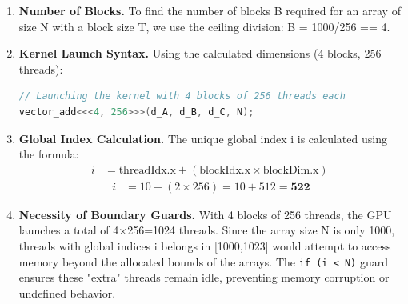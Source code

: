 
\begin{enumerate}[label=(\alph*)]
  \item \textbf{Number of Blocks.} To find the number of blocks B required for an array of size N with a block size T, we use the ceiling division: B = 1000/256 == 4.

\item \textbf{Kernel Launch Syntax.} Using the calculated dimensions (4 blocks, 256 threads):
\begin{lstlisting}[language=C++]
// Launching the kernel with 4 blocks of 256 threads each
vector_add<<<4, 256>>>(d_A, d_B, d_C, N);
\end{lstlisting}

\item \textbf{Global Index Calculation.} The unique global index i is calculated using the formula:
        \begin{align*}
          i &= \text{threadIdx.x} + (\text{blockIdx.x} \times \text{blockDim.x}) \
        \end{align*}
        \begin{align*}
            i &= 10 + (2 \times 256) = 10 + 512 = \mathbf{522}
        \end{align*}

\item \textbf{Necessity of Boundary Guards.}
With 4 blocks of 256 threads, the GPU launches a total of 4×256=1024 threads. Since the array size N is only 1000, threads with global indices i belongs in [1000,1023] would attempt to access memory beyond the allocated bounds of the arrays. The \texttt{if (i < N)} guard ensures these "extra" threads remain idle, preventing memory corruption or undefined behavior.
\end{enumerate}

